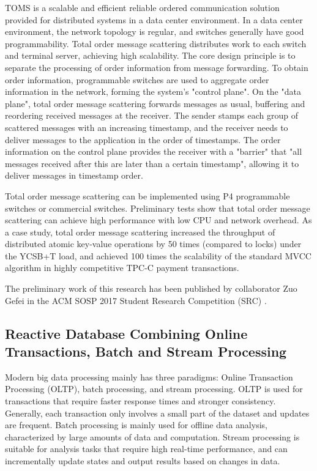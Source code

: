 TOMS is a scalable and efficient reliable ordered communication solution provided for distributed systems in a data center environment. In a data center environment, the network topology is regular, and switches generally have good programmability. Total order message scattering distributes work to each switch and terminal server, achieving high scalability. The core design principle is to separate the processing of order information from message forwarding. To obtain order information, programmable switches are used to aggregate order information in the network, forming the system's "control plane". On the "data plane", total order message scattering forwards messages as usual, buffering and reordering received messages at the receiver. The sender stamps each group of scattered messages with an increasing timestamp, and the receiver needs to deliver messages to the application in the order of timestamps. The order information on the control plane provides the receiver with a "barrier" that "all messages received after this are later than a certain timestamp", allowing it to deliver messages in timestamp order.

Total order message scattering can be implemented using P4 programmable switches or commercial switches. Preliminary tests show that total order message scattering can achieve high performance with low CPU and network overhead. As a case study, total order message scattering increased the throughput of distributed atomic key-value operations by 50 times (compared to locks) under the YCSB+T load, and achieved 100 times the scalability of the standard MVCC algorithm in highly competitive TPC-C payment transactions.

The preliminary work of this research has been published by collaborator Zuo Gefei in the ACM SOSP 2017 Student Research Competition (SRC) \cite{toms}.

\subsection{Reactive Database Combining Online Transactions, Batch and Stream Processing}

Modern big data processing mainly has three paradigms: Online Transaction Processing (OLTP), batch processing, and stream processing. OLTP is used for transactions that require faster response times and stronger consistency. Generally, each transaction only involves a small part of the dataset and updates are frequent. Batch processing is mainly used for offline data analysis, characterized by large amounts of data and computation. Stream processing is suitable for analysis tasks that require high real-time performance, and can incrementally update states and output results based on changes in data.

